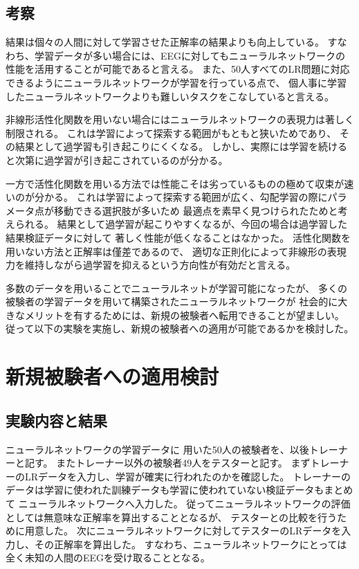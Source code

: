 \subsection{\mc 考察}
結果は個々の人間に対して学習させた正解率の結果よりも向上している。
すなわち、学習データが多い場合には、EEGに対してもニューラルネットワークの性能を活用することが可能であると言える。
また、50人すべてのLR問題に対応できるようにニューラルネットワークが学習を行っている点で、
個人事に学習したニューラルネットワークよりも難しいタスクをこなしていると言える。

非線形活性化関数を用いない場合にはニューラルネットワークの表現力は著しく制限される。
これは学習によって探索する範囲がもともと狭いためであり、
その結果として過学習も引き起こりにくくなる。
しかし、実際には学習を続けると次第に過学習が引き起こされているのが分かる。

一方で活性化関数を用いる方法では性能こそは劣っているものの極めて収束が速いのが分かる。
これは学習によって探索する範囲が広く、勾配学習の際にパラメータ点が移動できる選択肢が多いため
最適点を素早く見つけられたためと考えられる。
結果として過学習が起こりやすくなるが、今回の場合は過学習した結果検証データに対して
著しく性能が低くなることはなかった。
活性化関数を用いない方法と正解率は僅差であるので、
適切な正則化によって非線形の表現力を維持しながら過学習を抑えるという方向性が有効だと言える。

多数のデータを用いることでニューラルネットが学習可能になったが、
多くの被験者の学習データを用いて構築されたニューラルネットワークが
社会的に大きなメリットを有するためには、新規の被験者へ転用できることが望ましい。
従って以下の実験を実施し、新規の被験者への適用が可能であるかを検討した。

\section{\mc 新規被験者への適用検討}
\subsection{\mc 実験内容と結果}
ニューラルネットワークの学習データに
用いた50人の被験者を、以後トレーナーと記す。
またトレーナー以外の被験者49人をテスターと記す。
まずトレーナーのLRデータを入力し、学習が確実に行われたのかを確認した。
トレーナーのデータは学習に使われた訓練データも学習に使われていない検証データもまとめて
ニューラルネットワークへ入力した。
従ってニューラルネットワークの評価としては無意味な正解率を算出することとなるが、
テスターとの比較を行うために用意した。
次にニューラルネットワークに対してテスターのLRデータを入力し、その正解率を算出した。
すなわち、ニューラルネットワークにとっては全く未知の人間のEEGを受け取ることとなる。


